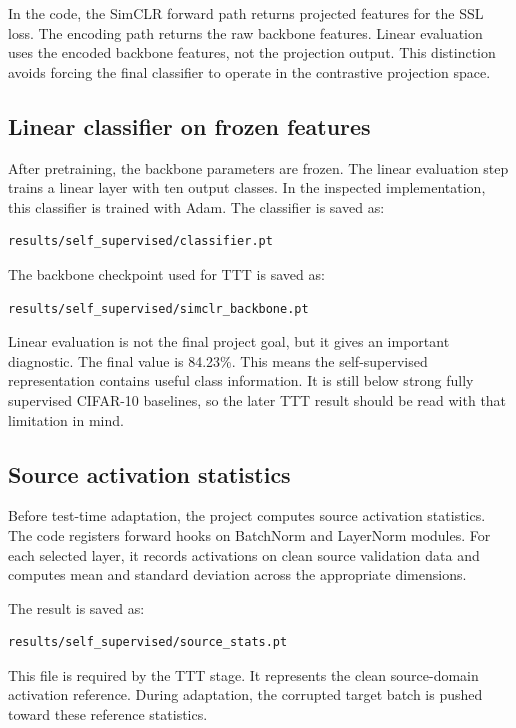 \documentclass[a4paper,11pt]{article}
\begin{document}
In the code, the SimCLR forward path returns projected features for the SSL loss. The encoding path returns the raw backbone features. Linear evaluation uses the encoded backbone features, not the projection output. This distinction avoids forcing the final classifier to operate in the contrastive projection space.

\subsection{Linear classifier on frozen features}

After pretraining, the backbone parameters are frozen. The linear evaluation step trains a linear layer with ten output classes. In the inspected implementation, this classifier is trained with Adam. The classifier is saved as:
\begin{lstlisting}
results/self_supervised/classifier.pt
\end{lstlisting}
The backbone checkpoint used for TTT is saved as:
\begin{lstlisting}
results/self_supervised/simclr_backbone.pt
\end{lstlisting}

Linear evaluation is not the final project goal, but it gives an important diagnostic. The final value is 84.23\%. This means the self-supervised representation contains useful class information. It is still below strong fully supervised CIFAR-10 baselines, so the later TTT result should be read with that limitation in mind.

\subsection{Source activation statistics}

Before test-time adaptation, the project computes source activation statistics. The code registers forward hooks on BatchNorm and LayerNorm modules. For each selected layer, it records activations on clean source validation data and computes mean and standard deviation across the appropriate dimensions.

The result is saved as:
\begin{lstlisting}
results/self_supervised/source_stats.pt
\end{lstlisting}
This file is required by the TTT stage. It represents the clean source-domain activation reference. During adaptation, the corrupted target batch is pushed toward these reference statistics.
\end{document}
